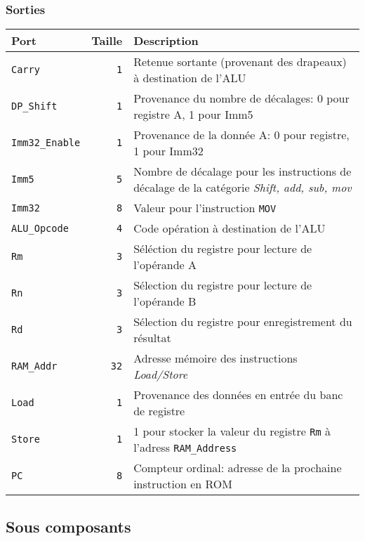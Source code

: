 \subsubsection{Sorties}

\begin{tabular}{|l|r|l|}
\hline 
\textbf{Port} & \textbf{Taille} & \textbf{Description}\\
\hline

\hline
\texttt{Carry}		&  \texttt{1} & Retenue sortante (provenant des drapeaux) à destination de l'ALU\\
\hline
\texttt{DP\_Shift}	&  \texttt{1} & Provenance du nombre de décalages: 0 pour registre A, 1 pour Imm5 \\
\hline
\texttt{Imm32\_Enable}	&  \texttt{1} & Provenance de la donnée A: 0 pour registre, 1 pour Imm32\\
\hline
\texttt{Imm5}		&  \texttt{5} & Nombre de décalage pour les instructions de décalage de la catégorie \textit{Shift, add, sub, mov}\\
\hline
\texttt{Imm32}		&  \texttt{8} & Valeur pour l'instruction \texttt{MOV}\\
\hline
\texttt{ALU\_Opcode}	&  \texttt{4} & Code opération à destination de l'ALU\\
\hline
\texttt{Rm}		&  \texttt{3} & Séléction du registre pour lecture de l'opérande A\\
\hline
\texttt{Rn}		&  \texttt{3} & Sélection du registre pour lecture de l'opérande B\\
\hline
\texttt{Rd}		&  \texttt{3} & Sélection du registre pour enregistrement du résultat\\
\hline
\texttt{RAM\_Addr}	& \texttt{32} & Adresse mémoire des instructions \textit{Load/Store}\\
\hline
\texttt{Load}		&  \texttt{1} & Provenance des données en entrée du banc de registre\\
\hline
\texttt{Store}		&  \texttt{1} & 1 pour stocker la valeur du registre \texttt{Rm} à l'adress \texttt{RAM\_Address}\\
\hline
\texttt{PC}		&  \texttt{8} & Compteur ordinal: adresse de la prochaine instruction en ROM\\


\hline
\end{tabular}

\subsection{Sous composants}

